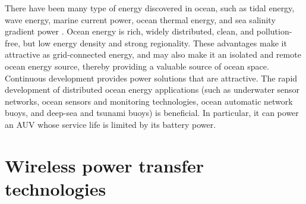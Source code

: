 There have been many type of energy discovered in ocean, such as tidal energy, wave energy, marine current power, ocean thermal energy, and sea salinity gradient power \cite{Capareda2019, Drew2009, Vlachogiannis2014, Zeng2020}.
Ocean energy is rich, widely distributed, clean, and pollution-free, but low energy density and strong regionality.
These advantages make it attractive as grid-connected energy, and may also make it an isolated and remote ocean energy source, thereby providing a valuable source of ocean space. Continuous development provides power solutions that are attractive. The rapid development of distributed ocean energy applications (such as underwater sensor networks, ocean sensors and monitoring technologies, ocean automatic network buoys, and deep-sea and tsunami buoys) is beneficial. In particular, it can power an AUV whose service life is limited by its battery power.


\section{Wireless power transfer technologies}

